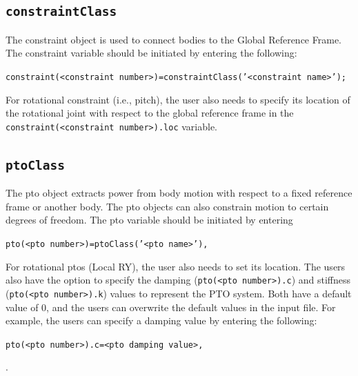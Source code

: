 \subsection{\texttt{constraintClass}}\label{subsec:constraint}
The constraint object is used to connect bodies to the Global Reference Frame. The constraint variable should be initiated by entering the following:

\begin{center}\texttt{constraint(<constraint number>)=constraintClass('<constraint name>');}\end{center} 

For rotational constraint (i.e., pitch), the user also needs to specify its location of the rotational joint with respect to the global reference frame in the \texttt{constraint(<constraint number>).loc} variable.

\subsection{\texttt{ptoClass}}\label{subsec:pto}
The pto object extracts power from body motion with respect to a fixed reference frame or another body. The pto objects can also constrain motion to certain degrees of freedom. The pto variable should be initiated by entering

\begin{center}\texttt{pto(<pto number>)=ptoClass('<pto name>'),}\end{center} 

For rotational ptos (Local RY), the user also needs to set its location. The users also have the option to specify the damping (\texttt{pto(<pto number>).c}) and stiffness (\texttt{pto(<pto number>).k}) values to represent the PTO system. Both have a default value of 0, and the users can overwrite the default values in the input file. For example, the users can specify a damping value by entering the following:

\begin{center}\texttt{pto(<pto number>).c=<pto damping value>,}\end{center}.

